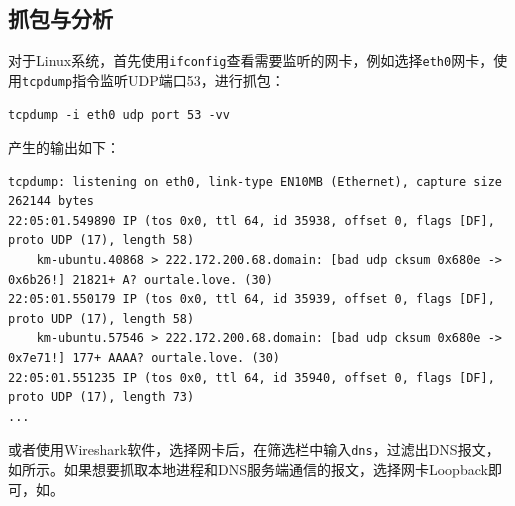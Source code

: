 \documentclass[lang=cn,11pt,a4paper,cite=authornum]{paper}
\begin{document}
\subsection{抓包与分析}

对于Linux系统，首先使用\texttt{ifconfig}查看需要监听的网卡，例如选择\texttt{eth0}网卡，使用\texttt{tcpdump}指令监听UDP端口53，进行抓包：

\begin{code}
\begin{verbatim}
tcpdump -i eth0 udp port 53 -vv
\end{verbatim}
\end{code}

产生的输出如下：

\begin{code}
\begin{verbatim}
tcpdump: listening on eth0, link-type EN10MB (Ethernet), capture size 262144 bytes
22:05:01.549890 IP (tos 0x0, ttl 64, id 35938, offset 0, flags [DF], proto UDP (17), length 58)
    km-ubuntu.40868 > 222.172.200.68.domain: [bad udp cksum 0x680e -> 0x6b26!] 21821+ A? ourtale.love. (30)
22:05:01.550179 IP (tos 0x0, ttl 64, id 35939, offset 0, flags [DF], proto UDP (17), length 58)
    km-ubuntu.57546 > 222.172.200.68.domain: [bad udp cksum 0x680e -> 0x7e71!] 177+ AAAA? ourtale.love. (30)
22:05:01.551235 IP (tos 0x0, ttl 64, id 35940, offset 0, flags [DF], proto UDP (17), length 73)
...
\end{verbatim}
\end{code}

或者使用Wireshark软件，选择网卡后，在筛选栏中输入\texttt{dns}，过滤出DNS报文，如所示。如果想要抓取本地进程和DNS服务端通信的报文，选择网卡Loopback即可，如。
\end{document}
